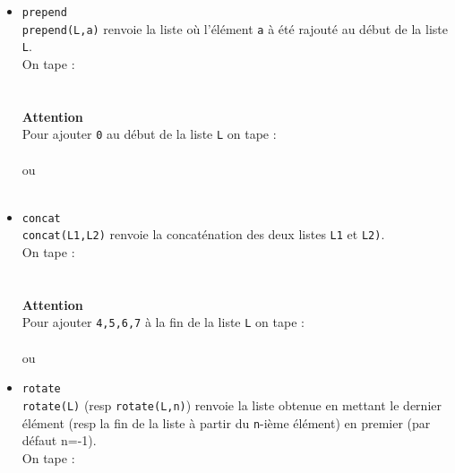 \documentclass[12pt,a4paper]{book}
\begin{document}
\begin{giacjshere}
\begin{itemize}
{\bf  Mais attention !}\\
{\tt L:=append(L,[4,5,6])} renvoie {\tt [1,2,3,[4,5,6]]}\\
Pour les cha\^{\i}nes de caract\`eres, supposons que  {\tt s} soit la 
cha\^{\i}ne {\tt "abc"} ({\tt s:="abc"}), on peut \'ecrire pour lui rajouter 
{\tt "def"} :\\
{\tt s:=append(s,"def")} ou {\tt s:=concat(s,"def")} ou {\tt s:=s+"def")}\\
\item
{\tt prepend}\\
{\tt prepend(L,a)} renvoie la liste o\`u l'\'el\'ement {\tt a} \`a \'et\'e
rajout\'e au d\'ebut de la liste {\tt L}.\\
On tape :\\
\\
\\
{\bf Attention}\\
Pour ajouter {\tt 0} au d\'ebut de la liste {\tt L} on tape :\\
\\
ou\\
\\
\item
{\tt concat}\\
{\tt concat(L1,L2)} renvoie la concat\'enation des deux listes {\tt L1} et 
{\tt L2)}.\\
On tape :\\
\\
\\
{\bf Attention}\\
Pour ajouter {\tt 4,5,6,7} \`a la fin de la liste {\tt L} on tape :\\
\\
ou\\
\item
{\tt rotate}\\
{\tt rotate(L)} (resp {\tt rotate(L,n)}) renvoie la liste obtenue en mettant le dernier \'el\'ement (resp la fin de la liste à partir du {\tt n}-i\`eme 
\'el\'ement) en premier (par d\'efaut n=-1).\\
On tape :\\
\\

\end{itemize}
\end{giacjshere}
\end{document}

